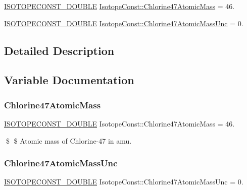\begin{DoxyCompactItemize}
\item 
\mbox{\hyperlink{group___isotope_const-_macros_ga8f45a7272ce02c0b4c65c44636ed719a}{I\+S\+O\+T\+O\+P\+E\+C\+O\+N\+S\+T\+\_\+\+D\+O\+U\+B\+LE}} \mbox{\hyperlink{group___isotope_const-_chlorine-_cl47_ga5387c3a3d212e154d106d7b5de9d3593}{Isotope\+Const\+::\+Chlorine47\+Atomic\+Mass}} = 46.
\item 
\mbox{\hyperlink{group___isotope_const-_macros_ga8f45a7272ce02c0b4c65c44636ed719a}{I\+S\+O\+T\+O\+P\+E\+C\+O\+N\+S\+T\+\_\+\+D\+O\+U\+B\+LE}} \mbox{\hyperlink{group___isotope_const-_chlorine-_cl47_ga5dff7e6960dbe32a320cd6611a306439}{Isotope\+Const\+::\+Chlorine47\+Atomic\+Mass\+Unc}} = 0.
\end{DoxyCompactItemize}


\subsection{Detailed Description}


\subsection{Variable Documentation}
\mbox{\label{group___isotope_const-_chlorine-_cl47_ga5387c3a3d212e154d106d7b5de9d3593}} 
\subsubsection{\texorpdfstring{Chlorine47\+Atomic\+Mass}{Chlorine47AtomicMass}}
{\footnotesize\ttfamily \mbox{\hyperlink{group___isotope_const-_macros_ga8f45a7272ce02c0b4c65c44636ed719a}{I\+S\+O\+T\+O\+P\+E\+C\+O\+N\+S\+T\+\_\+\+D\+O\+U\+B\+LE}} Isotope\+Const\+::\+Chlorine47\+Atomic\+Mass = 46.}

\$ \$ Atomic mass of Chlorine-\/47 in amu. \mbox{\label{group___isotope_const-_chlorine-_cl47_ga5dff7e6960dbe32a320cd6611a306439}} 
\subsubsection{\texorpdfstring{Chlorine47\+Atomic\+Mass\+Unc}{Chlorine47AtomicMassUnc}}
{\footnotesize\ttfamily \mbox{\hyperlink{group___isotope_const-_macros_ga8f45a7272ce02c0b4c65c44636ed719a}{I\+S\+O\+T\+O\+P\+E\+C\+O\+N\+S\+T\+\_\+\+D\+O\+U\+B\+LE}} Isotope\+Const\+::\+Chlorine47\+Atomic\+Mass\+Unc = 0.}

